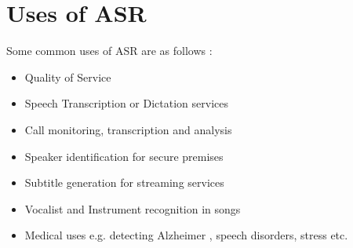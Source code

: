 \section{Uses of ASR}
\label{sec:uses-of-asr}
Some common uses of ASR are as follows \cite{backstrom_introduction_2022}:
\begin{itemize}
    \item Quality of Service
    \item Speech Transcription or Dictation services
    \item Call monitoring, transcription and analysis
    \item Speaker identification for secure premises
    \item Subtitle generation for streaming services
    \item Vocalist and Instrument recognition in songs
    \item Medical uses e.g. detecting Alzheimer \cite{konig_automatic_2015}, speech disorders, stress etc.
\end{itemize}






